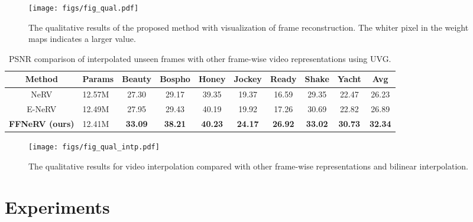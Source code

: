 \documentclass[sigconf]{acmart}
\begin{document}
\begin{figure*}[ht]
\begin{center}
\texttt{[image: figs/fig\_qual.pdf]}
\end{center}
  \caption{The qualitative results of the proposed method with visualization of frame reconstruction. The whiter pixel in the weight maps indicates a larger value.}
\label{fig_qual}
\end{figure*}

\begin{table*}[]
\caption{PSNR comparison of interpolated unseen frames with other frame-wise video representations using UVG.}
\vskip 0.15in
\centering
\begin{tabular}{c|l||ccccccc||c}
\hline
Method       & Params & Beauty & Bospho & Honey & Jockey & Ready & Shake & Yacht & Avg   \\ \hline\hline
NeRV   & 12.57M          & 27.30           & 29.17           & 39.35          & 19.37           & 16.59          & 29.35          & 22.47          & 26.23 \\ \hline
E-NeRV & 12.49M          & 27.95           & 29.43           & 40.19          & 19.92           & 17.26          & 30.69          & 22.82          & 26.89 \\ \hline
\textbf{FFNeRV (ours)}   & 12.41M          & \textbf{33.09}           & \textbf{38.21}           & \textbf{40.23}          & \textbf{24.17}           & \textbf{26.92}          & \textbf{33.02}          & \textbf{30.73}          & \textbf{32.34} \\ \hline
\end{tabular}
\label{tab_intp}
\end{table*}

\begin{figure*}[ht]
\begin{center}
\texttt{[image: figs/fig\_qual\_intp.pdf]}
\end{center}
  \caption{The qualitative results for video interpolation compared with other frame-wise representations and bilinear interpolation.}
\label{fig_qual_intp}
\end{figure*}




\section{Experiments}
\end{document}
